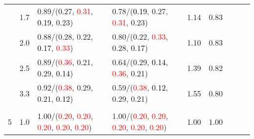 \documentclass[10pt,a4paper]{report}
\begin{document}
\begin{table}[!htbp]
\begin{center}
{\begin{tabular}{ccllccccc}
				  & 1.7                               & 0.89/(0.27, \textcolor{red}{0.31}, \textcolor{black}{0.19}, 0.23)                                                                                                                             & 0.78/(\textcolor{black}{0.19}, 0.27, \textcolor{red}{0.31}, 0.23)                                                                                                                             & 1.14             & 0.83                     \\
				  & 2.0                               & 0.88/(0.28, 0.22, \textcolor{black}{0.17}, \textcolor{red}{0.33})                                                                                                                             & 0.80/(0.22, \textcolor{red}{0.33}, 0.28, \textcolor{black}{0.17})                                                                                                                             & 1.10             & 0.83                     \\
				  & 2.5                               & 0.89/(\textcolor{red}{0.36}, 0.21, 0.29, \textcolor{black}{0.14})                                                                                                                             & 0.64/(0.29, \textcolor{black}{0.14}, \textcolor{red}{0.36}, 0.21)                                                                                                                             & 1.39             & 0.82                     \\
				  & 3.3                               & 0.92/(\textcolor{red}{0.38}, 0.29, 0.21, \textcolor{black}{0.12})                                                                                                                             & 0.59/(\textcolor{red}{0.38}, \textcolor{black}{0.12}, 0.29, 0.21)                                                                                                                             & 1.55             & 0.80                     \\
				  &                                   &                                                                                                                                                                                               &                                                                                                                                                                                               &                                             \\
				5 & 1.0                               & 1.00/(\textcolor{red}{0.20}, \textcolor{red}{0.20}, \textcolor{red}{0.20}, \textcolor{red}{0.20}, \textcolor{red}{0.20})                                                                      & 1.00/(\textcolor{red}{0.20}, \textcolor{red}{0.20}, \textcolor{red}{0.20}, \textcolor{red}{0.20}, \textcolor{red}{0.20})                                                                      & 1.00             & 1.00                     \\

\end{tabular}}
\end{center}
\end{table}
\end{document}
